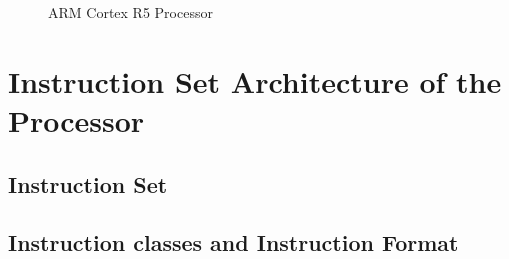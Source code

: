 \documentclass[a4paper,11pt]{article}
\begin{document}
 \begin{figure}[!h]
	\centering
	\hfill
\caption{ARM Cortex R5 Processor}
\end{figure}
\pagebreak

\section{Instruction Set Architecture of the Processor}

\subsection{Instruction Set}

\subsection{Instruction classes and Instruction Format}
\end{document}
